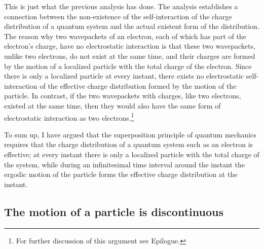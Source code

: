 This is just what the previous analysis has done. The analysis establishes a connection between the non-existence of the self-interaction of the charge distribution of a quantum system and the actual existent form of the distribution. The reason why two wavepackets of an electron, each of which has part of the electron's charge, have no electrostatic interaction is that these two wavepackets, unlike two electrons, do not exist at the same time, and their charges are formed by the motion of a localized particle with the total charge of the electron. Since there is only a localized particle at every instant, there exists no electrostatic self-interaction of the effective charge distribution formed by the motion of the particle. In contrast, if the two wavepackets with charges, like two electrons, existed at the same time, then they would also have the same form of electrostatic interaction as two electrons.\footnote{For further discussion of this argument see Epilogue.}

To sum up, I have argued that the superposition principle of quantum mechanics requires that the charge distribution of a quantum system such as an electron is effective; at every instant there is only a localized particle with the total charge of the system, while during an infinitesimal time interval around the instant the ergodic motion of the particle forms the effective charge distribution at the instant.

\subsection{The motion of a particle is discontinuous}

